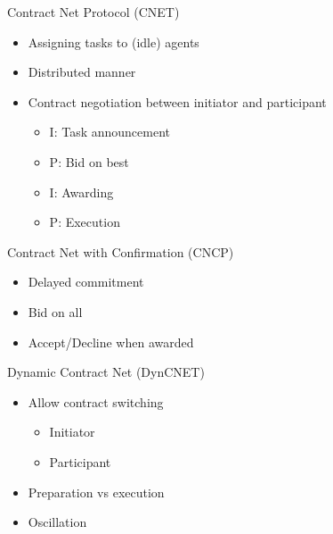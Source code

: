 \documentclass{beamer}
\begin{document}
	\begin{frame}{Contract Net Protocol (CNET)}
		\begin{itemize}
			\item Assigning tasks to (idle) agents
			\item Distributed manner
			\item Contract negotiation between initiator and participant
			\begin{itemize}
				\item I: Task announcement
				\item P: Bid on best
				\item I: Awarding
				\item P: Execution
			\end{itemize}
		\end{itemize}
	\end{frame}
	

	\begin{frame}{Contract Net with Confirmation (CNCP)}
		\begin{itemize}
			\item Delayed commitment
			\item Bid on all
			\item Accept/Decline when awarded
		\end{itemize}
	\end{frame}

	\begin{frame}{Dynamic Contract Net (DynCNET)}
		\begin{itemize}
			\item Allow contract switching
				\begin{itemize}
				\item Initiator
				\item Participant
				\end{itemize}
			\item Preparation vs execution
			\item Oscillation
		\end{itemize}
	\end{frame}
	
\end{document}
